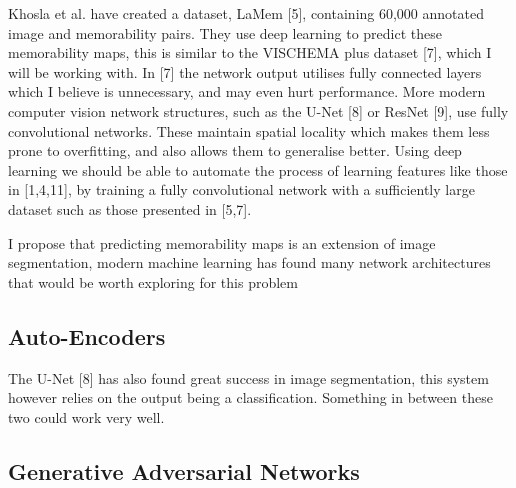 \documentclass{UoYCSproject}
\begin{document}
Khosla et al. have created a dataset, LaMem [5], containing 60,000 annotated image and memorability pairs. They use deep learning to predict these memorability maps, this is similar to the VISCHEMA plus dataset [7], which I will be working with. In [7] the network output utilises fully connected layers which I believe is unnecessary, and may even hurt performance. More modern computer vision network structures, such as the U-Net [8] or ResNet [9], use fully convolutional networks. These maintain spatial locality which makes them less prone to overfitting, and also allows them to generalise better. Using deep learning we should be able to automate the process of learning features like those in [1,4,11], by training a fully convolutional network with a sufficiently large dataset such as those presented in [5,7].

I propose that predicting memorability maps is an extension of image segmentation, modern machine learning has found many network architectures that would be worth exploring for this problem

\subsection{Auto-Encoders}


The U-Net [8] has also found great success in image segmentation, this system however relies on the output being a classification. Something in between these two could work very well.


\subsection{Generative Adversarial Networks}
\end{document}
